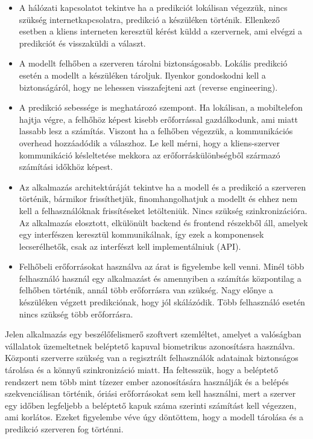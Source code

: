 \begin{itemize}
	\item A hálózati kapcsolatot tekintve ha a predikciót lokálisan végezzük, nincs szükség internetkapcsolatra, predikció a készüléken történik. Ellenkező esetben a kliens interneten keresztül kérést küldd a szervernek, ami elvégzi a predikciót és visszaküldi a választ.
	\item A modellt felhőben a szerveren tárolni biztonságosabb. Lokális predikció esetén a modellt a készüléken tároljuk. Ilyenkor gondoskodni kell a biztonságáról, hogy ne lehessen visszafejteni azt (reverse engineering).
	\item A predikció sebessége is meghatározó szempont. Ha lokálisan, a mobiltelefon hajtja végre, a felhőhöz képest kisebb erőforrással gazdálkodunk, ami miatt lassabb lesz a számítás. Viszont ha a felhőben végezzük, a kommunikációs overhead hozzáadódik a válaszhoz. Le kell mérni, hogy a kliens-szerver kommunikáció késleltetése mekkora az erőforráskülönbségből származó számítási időkhöz képest.
	\item Az alkalmazás architektúráját tekintve ha a modell és a predikció a szerveren történik, bármikor frissíthetjük, finomhangolhatjuk a modellt és ehhez nem kell a felhasználóknak frissítéseket letölteniük. Nincs szükség szinkronizációra. Az alkalmazás elosztott, elkülönült backend és frontend részekből áll, amelyek egy interfészen keresztül kommunikálnak, így ezek a komponensek lecserélhetők, csak az interfészt kell implementálniuk (API).
	\item Felhőbeli erőforrásokat használva az árat is figyelembe kell venni. Minél több felhasználó használ egy alkalmazást és amennyiben a számítás központilag a felhőben történik, annál több erőforrásra van szükség. Nagy előnye a készüléken végzett predikciónak, hogy jól skálázódik. Több felhasználó esetén nincs szükség több erőforrásra.
\end{itemize}

Jelen alkalmazás egy beszélőfelismerő szoftvert szemléltet, amelyet a valóságban vállalatok üzemeltetnek beléptető kapuval biometrikus azonosításra használva. Központi szerverre szükség van a regisztrált felhasználók adatainak biztonságos tárolása és a könnyű szinkronizáció miatt. Ha feltesszük, hogy a beléptető rendszert nem több mint tízezer ember azonosítására használják és a belépés szekvenciálisan történik, óriási erőforrásokat sem kell használni, mert a szerver egy időben legfeljebb a beléptető kapuk száma szerinti számítást kell végezzen, ami korlátos. Ezeket figyelembe véve úgy döntöttem, hogy a modell tárolása és a predikció szerveren fog történni.

